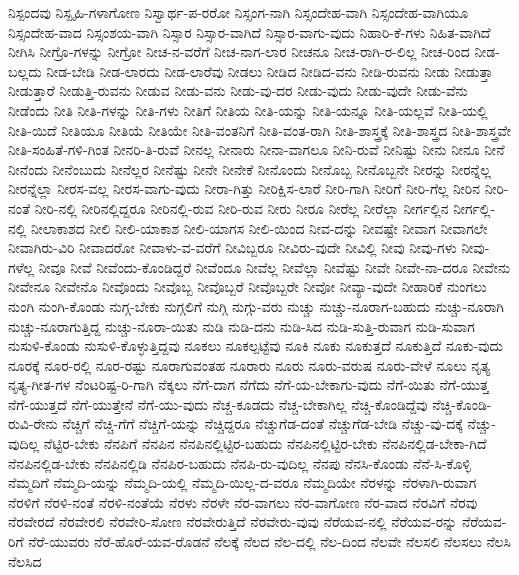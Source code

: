 {ನಿಸ್ಪಂದವು
ನಿಸ್ಪೃಹಿ-ಗಳಾಗೋಣ
ನಿಸ್ವಾರ್ಥ-ಪ-ರರೋ
ನಿಸ್ಸಂಗ-ನಾಗಿ
ನಿಸ್ಸಂದೇಹ-ವಾಗಿ
ನಿಸ್ಸಂದೇಹ-ವಾಗಿಯೂ
ನಿಸ್ಸಂದೇಹ-ವಾದ
ನಿಸ್ಸಂಶಯ-ವಾಗಿ
ನಿಸ್ಸಾರ
ನಿಸ್ಸಾರ-ವಾಗಿದೆ
ನಿಸ್ಸಾರ-ವಾಗು-ವುದು
ನಿಹಾರಿ-ಕೆ-ಗಳು
ನಿಹಿತ-ವಾಗಿದೆ
ನೀಗಿಸಿ
ನೀಗ್ರೊ-ಗಳನ್ನು
ನೀಗ್ರೋ
ನೀಚ-ನ-ವರೆಗೆ
ನೀಚ-ನಾಗ-ಲಾರ
ನೀಚನೂ
ನೀಚ-ರಾಗಿ-ರ-ಲಿಲ್ಲ
ನೀಚ-ರಿಂದ
ನೀಡ-ಬಲ್ಲದು
ನೀಡ-ಬೇಡಿ
ನೀಡ-ಲಾರದು
ನೀಡ-ಲಾರೆವು
ನೀಡಲು
ನೀಡಿದ
ನೀಡಿದ-ವನು
ನೀಡಿ-ರುವನು
ನೀಡು
ನೀಡುತ್ತಾ
ನೀಡುತ್ತಾರೆ
ನೀಡುತ್ತಿ-ರುವನು
ನೀಡುವ
ನೀಡು-ವನು
ನೀಡು-ವು-ದರ
ನೀಡು-ವುದು
ನೀಡು-ವುದೇ
ನೀಡು-ವೆನು
ನೀಡೆಂದು
ನೀತಿ
ನೀತಿ-ಗಳನ್ನು
ನೀತಿ-ಗಳು
ನೀತಿಗೆ
ನೀತಿಯ
ನೀತಿ-ಯನ್ನು
ನೀತಿ-ಯನ್ನೂ
ನೀತಿ-ಯಲ್ಲವೆ
ನೀತಿ-ಯಲ್ಲಿ
ನೀತಿ-ಯಿದೆ
ನೀತಿಯೂ
ನೀತಿಯೆ
ನೀತಿಯೇ
ನೀತಿ-ವಂತನಿಗೆ
ನೀತಿ-ವಂತ-ರಾಗಿ
ನೀತಿ-ಶಾಸ್ತ್ರಕ್ಕೆ
ನೀತಿ-ಶಾಸ್ತ್ರದ
ನೀತಿ-ಶಾಸ್ತ್ರವೇ
ನೀತಿ-ಸಂಹಿತೆ-ಗಳಿ-ಗಿಂತ
ನೀನರಿ-ತಿ-ರುವೆ
ನೀನಲ್ಲ
ನೀನಾರು
ನೀನಾ-ವಾಗಲೂ
ನೀನಿ-ರುವೆ
ನೀನಿಷ್ಟು
ನೀನು
ನೀನೂ
ನೀನೆ
ನೀನೆಂದು
ನೀನೆಂಬುದು
ನೀನೆಲ್ಲರ
ನೀನೆಷ್ಟು
ನೀನೇ
ನೀನೇಕೆ
ನೀನೊಂದು
ನೀನೊಬ್ಬ
ನೀನೊಬ್ಬನೇ
ನೀರನ್ನು
ನೀರನ್ನೆಲ್ಲ
ನೀರನ್ನೆಲ್ಲಾ
ನೀರಸ-ವಲ್ಲ
ನೀರಸ-ವಾಗು-ವುದು
ನೀರಾ-ಗಿತ್ತು
ನೀರಿಕ್ಷಿಸ-ಲಾರೆ
ನೀರಿ-ಗಾಗಿ
ನೀರಿಗೆ
ನೀರಿ-ಗೆಲ್ಲ
ನೀರಿನ
ನೀರಿ-ನಂತೆ
ನೀರಿ-ನಲ್ಲಿ
ನೀರಿನಲ್ಲಿದ್ದರೂ
ನೀರಿನಲ್ಲಿ-ರುವ
ನೀರಿ-ರುವ
ನೀರು
ನೀರೂ
ನೀರೆಲ್ಲ
ನೀರೆಲ್ಲಾ
ನೀರ್ಗಲ್ಲಿನ
ನೀರ್ಗಲ್ಲಿ-ನಲ್ಲಿ
ನೀಲಾಕಾಶದ
ನೀಲಿ
ನೀಲಿ-ಯಾಕಾಶ
ನೀಲಿ-ಯಾಗಸ
ನೀಲಿ-ಯಿಂದ
ನೀವ-ದನ್ನು
ನೀವಷ್ಟೇ
ನೀವಾಗ
ನೀವಾಗಲೇ
ನೀವಾಗಿರು-ವಿರಿ
ನೀವಾದರೋ
ನೀವಾಳು-ವ-ವರೆಗೆ
ನೀವಿಬ್ಬರೂ
ನೀವಿರು-ವುದೇ
ನೀವಿಲ್ಲಿ
ನೀವು
ನೀವು-ಗಳು
ನೀವು-ಗಳೆಲ್ಲ
ನೀವೂ
ನೀವೆ
ನೀವೆಂದು-ಕೊಂಡಿದ್ದರೆ
ನೀವೆಂದೂ
ನೀವೆಲ್ಲ
ನೀವೆಲ್ಲಾ
ನೀವೆಷ್ಟು
ನೀವೇ
ನೀವೇ-ನಾ-ದರೂ
ನೀವೇನು
ನೀವೇನೂ
ನೀವೇನೊ
ನೀವೊಂದು
ನೀವೊಬ್ಬ
ನೀವೊಬ್ಬರೆ
ನೀವೊಬ್ಬರೇ
ನೀವೋ
ನೀವ್ಯಾ-ವುದೇ
ನೀಹಾರಿಕೆ
ನುಂಗಲು
ನುಂಗಿ
ನುಂಗಿ-ಕೊಂಡು
ನುಗ್ಗ-ಬೇಕು
ನುಗ್ಗಲಿಗೆ
ನುಗ್ಗಿ
ನುಗ್ಗು-ವರು
ನುಚ್ಚು
ನುಚ್ಚು-ನೂರಾಗ-ಬಹುದು
ನುಚ್ಚು-ನೂರಾಗಿ
ನುಚ್ಚು-ನೂರಾಗುತ್ತಿದ್ದ
ನುಚ್ಚು-ನೂರಾ-ಯಿತು
ನುಡಿ
ನುಡಿ-ದನು
ನುಡಿ-ಸಿದ
ನುಡಿ-ಸುತ್ತಿ-ರುವಾಗ
ನುಡಿ-ಸುವಾಗ
ನುಸುಳಿ-ಕೊಂಡು
ನುಸುಳಿ-ಕೊಳ್ಳುತ್ತಿದ್ದವು
ನೂಕಲು
ನೂಕಲ್ಪಟ್ಟೆವು
ನೂಕಿ
ನೂಕು
ನೂಕುತ್ತದೆ
ನೂಕುತ್ತಿದೆ
ನೂಕು-ವುದು
ನೂರಕ್ಕೆ
ನೂರ-ರಲ್ಲಿ
ನೂರ-ರಷ್ಟು
ನೂರಾಗುವಂತಹ
ನೂರಾರು
ನೂರು
ನೂರು-ವರುಷ
ನೂರು-ವೇಳೆ
ನೂಲು
ನೃತ್ಯ
ನೃತ್ಯ-ಗೀತ-ಗಳ
ನೆಂಟರಿಷ್ಟ-ರಿ-ಗಾಗಿ
ನೆಕ್ಕಲು
ನೆಗೆ-ದಾಗ
ನೆಗೆದು
ನೆಗೆ-ಯ-ಬೇಕಾಗು-ವುದು
ನೆಗೆ-ಯಿತು
ನೆಗೆ-ಯುತ್ತ
ನೆಗೆ-ಯುತ್ತದೆ
ನೆಗೆ-ಯುತ್ತೇನೆ
ನೆಗೆ-ಯು-ವುದು
ನೆಚ್ಚ-ಕೂಡದು
ನೆಚ್ಚ-ಬೇಕಾಗಿಲ್ಲ
ನೆಚ್ಚಿ-ಕೊಂಡಿದ್ದೆವು
ನೆಚ್ಚಿ-ಕೊಂಡಿ-ರುವಿ-ರೇನು
ನೆಚ್ಚಿಗೆ
ನೆಚ್ಚಿ-ಗೆಗೆ
ನೆಚ್ಚಿಗೆ-ಯನ್ನು
ನೆಚ್ಚಿದ್ದರೂ
ನೆಚ್ಚುಗೆಡ-ದಂತೆ
ನೆಚ್ಚುಗೆಡ-ಬೇಡಿ
ನೆಚ್ಚು-ವು-ದಕ್ಕೆ
ನೆಚ್ಚು-ವುದಿಲ್ಲ
ನೆಟ್ಟಿರ-ಬೇಕು
ನೆನಪಿಗೆ
ನೆನಪಿನ
ನೆನಪಿನಲ್ಲಿಟ್ಟಿರ-ಬಹುದು
ನೆನಪಿನಲ್ಲಿಟ್ಟಿರ-ಬೇಕು
ನೆನಪಿನಲ್ಲಿಡ-ಬೇಕಾ-ಗಿದೆ
ನೆನಪಿನಲ್ಲಿಡ-ಬೇಕು
ನೆನಪಿನಲ್ಲಿಡಿ
ನೆನಪಿರ-ಬಹುದು
ನೆನಪಿ-ರು-ವುದಿಲ್ಲ
ನೆನಪು
ನೆನಸಿ-ಕೊಂಡು
ನೆನೆ-ಸಿ-ಕೊಳ್ಳಿ
ನೆಮ್ಮದಿಗೆ
ನೆಮ್ಮದಿ-ಯನ್ನು
ನೆಮ್ಮದಿ-ಯಲ್ಲಿ
ನೆಮ್ಮದಿ-ಯಿಲ್ಲ-ದ-ವರೂ
ನೆಮ್ಮದಿಯೇ
ನೆರಳನ್ನು
ನೆರಳಾಗಿ-ರುವಾಗ
ನೆರಳಿಗೆ
ನೆರಳಿ-ನಂತೆ
ನೆರಳಿ-ನಂತೆಯೆ
ನೆರಳು
ನೆರಳೇ
ನೆರ-ವಾಗಲು
ನೆರ-ವಾಗೋಣ
ನೆರ-ವಾದ
ನೆರವಿಗೆ
ನೆರವು
ನೆರವೇರದೆ
ನೆರವೇರಲಿ
ನೆರವೇರಿ-ಸೋಣ
ನೆರವೇರುತ್ತಿದೆ
ನೆರವೇರು-ವುವು
ನೆರೆಯವ-ನಲ್ಲಿ
ನೆರೆಯವ-ರನ್ನು
ನೆರೆಯವ-ರಿಗೆ
ನೆರೆ-ಯುವರು
ನೆರೆ-ಹೊರೆ-ಯವ-ರೊಡನೆ
ನೆಲಕ್ಕೆ
ನೆಲದ
ನೆಲ-ದಲ್ಲಿ
ನೆಲ-ದಿಂದ
ನೆಲವೇ
ನೆಲಸಲಿ
ನೆಲಸಲು
ನೆಲಸಿ
ನೆಲಸಿದ
}
